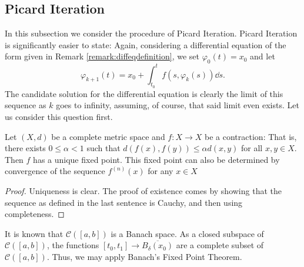 \documentclass[prb,12pt]{revtex4-2}
\theoremstyle{definition}
\theoremstyle{definition}
\theoremstyle{definition}
\begin{document}
	\subsection{Picard Iteration}
	In this subsection we consider the procedure of Picard Iteration. Picard Iteration is significantly easier to state: Again, considering a differential equation of the form given in Remark \ref{remark:diffeqdefinition}, we set $\varphi_0(t)=x_0$ and let
	\[\varphi_{k+1}(t) = x_0+\int_{t_0}^{t} f(s, \varphi_k(s))\dd{s}.\]
	The candidate solution for the differential equation is clearly the limit of this sequence as $k$ goes to infinity, assuming, of course, that said limit even exists. Let us consider this question first.
	\begin{Theorem}
		Let $(X, d)$ be a complete metric space and $f:X\to X$ be a contraction: That is, there exists $0\le\alpha<1$ such that $d(f(x), f(y))\le \alpha d(x,y)$ for all $x,y\in X$. Then $f$ has a unique fixed point. This fixed point can also be determined by convergence of the sequence $f^{(n)}(x)$ for any $x\in X$
	\end{Theorem}
	\begin{proof}
		Uniqueness is clear. The proof of existence comes by showing that the sequence as defined in the last sentence is Cauchy, and then using completeness.
	\end{proof}
	\begin{Theorem}
		It is known that $\mathcal{C}([a,b])$ is a Banach space. As a closed subspace of $\mathcal{C}([a,b])$, the functions $[t_0,t_1]\to \overline{B_\delta(x_0)}$ are a complete subset of $\mathcal{C}([a,b])$. Thus, we may apply Banach's Fixed Point Theorem.
	\end{Theorem}
\end{document}
